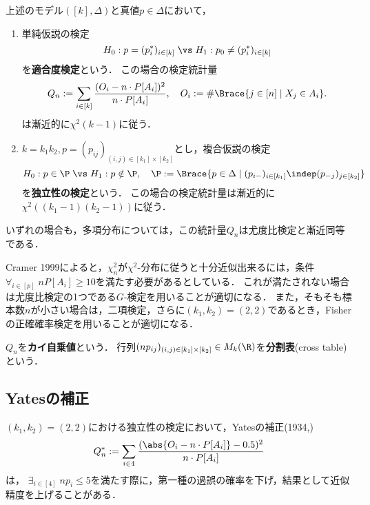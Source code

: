 \documentclass[uplatex,dvipdfmx]{jsreport}
\begin{document}
\begin{problem}
    上述のモデル$([k],\Delta)$と真値$p\in\Delta$において，
    \begin{enumerate}
        \item 単純仮説の検定
        \[H_0:p=(p^*_i)_{i\in[k]}\;\vs\;H_1:p_0\ne(p^*_i)_{i\in[k]}\]
        を\textbf{適合度検定}という．
        この場合の検定統計量
        \[Q_n:=\sum_{i\in[k]}\frac{(O_i-n\cdot P[A_i])^2}{n\cdot P[A_i]},\quad O_i:=\#\Brace{j\in[n]\mid X_j\in A_i}.\]
        は漸近的に$\chi^2(k-1)$に従う．
        \item $k=k_1k_2,p=(p_{ij})_{(i,j)\in[k_1]\times[k_2]}$とし，複合仮説の検定
        \[H_0:p\in\P\;\vs\;H_1:p\notin\P,\quad\P:=\Brace{p\in\Delta\mid(p_{i-})_{i\in[k_1]}\indep(p_{-j})_{j\in[k_2]}}\]
        を\textbf{独立性の検定}という．
        この場合の検定統計量は漸近的に$\chi^2((k_1-1)(k_2-1))$に従う．
    \end{enumerate}
    いずれの場合も，多項分布については，この統計量$Q_n$は尤度比検定と漸近同等である．
\end{problem}
\begin{remarks}
    Cramer 1999によると，$\chi^2_n$が$\chi^2$-分布に従うと十分近似出来るには，条件$\forall_{i\in[p]}\;nP[A_i]\ge10$を満たす必要があるとしている．
    これが満たされない場合は尤度比検定の1つである$G$-検定を用いることが適切になる．
    また，そもそも標本数$n$が小さい場合は，二項検定，さらに$(k_1,k_2)=(2,2)$であるとき，Fisherの正確確率検定を用いることが適切になる．

\end{remarks}

\begin{application}
    $Q_n$を\textbf{カイ自乗値}という．
    行列$(np_{ij})_{(i,j)\in[k_1]\times[k_2]}\in M_k(\R)$を\textbf{分割表}(cross table)という．
\end{application}

\subsection{Yatesの補正}

\begin{tcolorbox}[colframe=ForestGreen, colback=ForestGreen!10!white,breakable,colbacktitle=ForestGreen!40!white,coltitle=black,fonttitle=\bfseries\sffamily,
title=]
    $(k_1,k_2)=(2,2)$における独立性の検定において，Yatesの補正(1934,\cite{Yates})
    \[Q_n^*:=\sum_{i\in4}\frac{(\abs{O_i-n\cdot P[A_i]}-0.5)^2}{n\cdot P[A_i]}\]
    は，
    $\exists_{i\in[4]}\;np_i\le5$を満たす際に，第一種の過誤の確率を下げ，結果として近似精度を上げることがある．
\end{tcolorbox}
\end{document}
